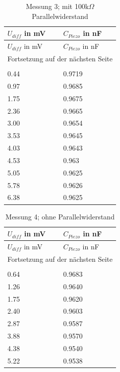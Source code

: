 \documentclass[12pt]{scrreprt} %
\begin{document}
\setlongtables
\begin{longtable}{| l | l |}
\hline
$U_{diff}$ in mV&$C_{Piezo}$ in nF\\
\hline
\endfirsthead
\hline
$U_{diff}$ in mV&$C_{Piezo}$ in nF\\
\hline
\endhead
\hline
\multicolumn{2}{|c|}{Fortsetzung auf der nächsten Seite}\\
\hline
\endfoot
\hline \hline
\caption{Messung 3; mit 100k$\Omega$ Parallelwiderstand}\\
\endlastfoot
\hline
\label{tab:2.3}%
0.44&0.9719\\
0.97&0.9685\\
1.75&0.9675\\
2.36&0.9665\\
3.00&0.9654\\
3.53&0.9645\\
4.03&0.9643\\
4.53&0.963\\
5.05&0.9625\\
5.78&0.9626\\
6.38&0.9625\\
\end{longtable}

\setlongtables
\begin{longtable}{| l | l |}
\hline
$U_{diff}$ in mV&$C_{Piezo}$ in nF\\
\hline
\endfirsthead
\hline
$U_{diff}$ in mV&$C_{Piezo}$ in nF\\
\hline
\endhead
\hline
\multicolumn{2}{|c|}{Fortsetzung auf der nächsten Seite}\\
\hline
\endfoot
\hline \hline
\caption{Messung 4; ohne Parallelwiderstand}\\
\endlastfoot
\hline
\label{tab:2.4}%
0.64&0.9683\\
1.26&0.9640\\
1.75&0.9620\\
2.40&0.9603\\
2.87&0.9587\\
3.88&0.9570\\
4.38&0.9540\\
5.22&0.9538\\
\end{longtable}
\end{document}
